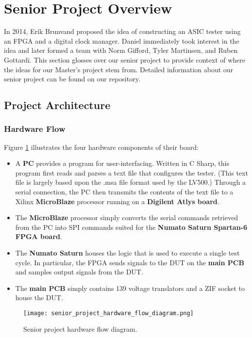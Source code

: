 \section{Senior Project Overview}

In 2014, Erik Brunvand proposed the idea of constructing an ASIC tester using an FPGA and a digital clock manager. Daniel immediately took interest in the idea and later formed a team with Norm Gifford, Tyler Martinsen, and Ruben Gottardi. This section glosses over our senior project to provide context of where the ideas for our Master's project stem from. Detailed information about our senior project can be found on our repository. 

\subsection{Project Architecture}

\subsubsection{Hardware Flow}
Figure \ref{fig:senior_project_hardware_flow} illustrates the four hardware components of their board: 
\begin{itemize}
\item A \textbf{PC} provides a program for user-interfacing. Written in C Sharp, this program first reads and parses a text file that configures the tester. (This text file is largely based upon the .msa file format used by the LV500.) Through a serial connection, the PC then transmits the contents of the text file to a Xilinx \textbf{MicroBlaze} processor running on a \textbf{Digilent Atlys board}. 
\item The \textbf{MicroBlaze} processor simply converts the serial commands retrieved from the PC into SPI commands suited for the \textbf{Numato Saturn Spartan-6 FPGA board}.
\item The \textbf{Numato Saturn} houses the logic that is used to execute a single test cycle. In particular, the FPGA sends signals to the DUT on the \textbf{main PCB} and samples output signals from the DUT. 
\item The \textbf{main PCB} simply contains 139 voltage translators and a ZIF socket to house the DUT. 
\end{itemize}

\begin{figure}
\texttt{[image: senior\_project\_hardware\_flow\_diagram.png]}
\caption{Senior project hardware flow diagram.}
\label{fig:senior_project_hardware_flow}
\end{figure}

